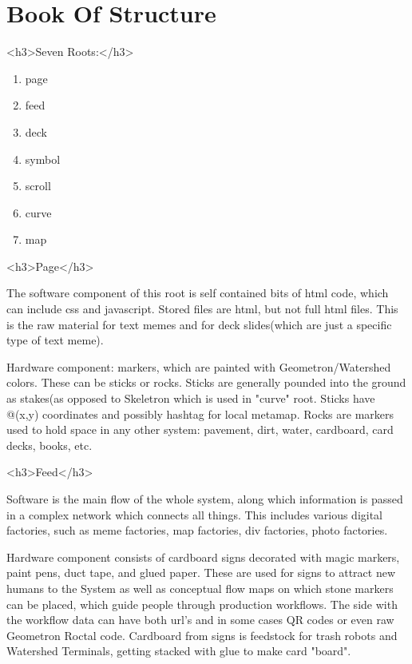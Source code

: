 \documentclass[11pt]{article}
\begin{document}
\section{
Book Of Structure}

<h3>Seven Roots:</h3>
\begin{enumerate}

    \item
page
    \item
feed
    \item
deck
    \item
symbol
    \item
scroll
    \item
curve
    \item
map
\end{enumerate}

<h3>Page</h3>




The software component of this root is self contained bits of html code, which can include css and javascript.  Stored files are html, but not full html files.  This is the raw material for text memes and for deck slides(which are just a specific type of text meme).     






    Hardware component: markers, which are painted with Geometron/Watershed colors. These can be sticks or rocks.  Sticks are generally pounded into the ground as stakes(as opposed to Skeletron which is used in "curve" root.  Sticks have @(x,y) coordinates and possibly hashtag for local metamap.  Rocks are markers used to hold space in any other system: pavement, dirt, water, cardboard, card decks, books, etc.


<h3>Feed</h3>




    Software is the main flow of the whole system, along which information is passed in a complex network which connects all things.  This includes various digital factories, such as meme factories, map factories, div factories, photo factories.  




    Hardware component consists of cardboard signs decorated with magic markers, paint pens, duct tape, and glued paper.  These are used for signs to attract new humans to the System as well as conceptual flow maps on which stone markers can be placed, which guide people through production workflows.  The side with the workflow data can have both url's and in some cases QR codes or even raw Geometron Roctal code.  Cardboard from signs is feedstock for trash robots and Watershed Terminals, getting stacked with glue to make card "board".
\end{document}
